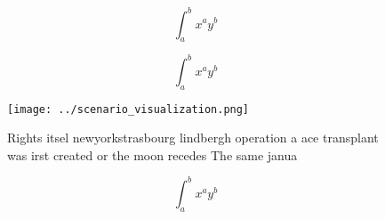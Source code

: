 \documentclass[a4paper]{article}
\begin{document}
\[ \int_{a}^{b}{x^{a}y^{b}} \]

\[ \int_{a}^{b}{x^{a}y^{b}} \]

\begin{figure}
\centering
\texttt{[image: ../scenario\_visualization.png]}
\caption{Rights itsel newyorkstrasbourg lindbergh operation a ace transplant was irst created or the moon recedes The same janua
}
\end{figure}
 
\[ \int_{a}^{b}{x^{a}y^{b}} \]
\end{document}

